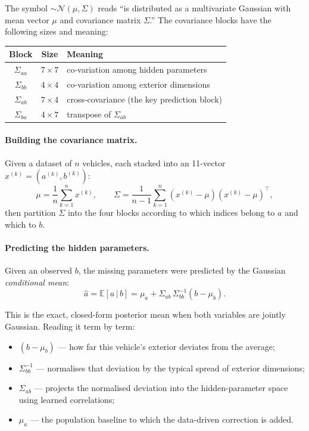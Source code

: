 \documentclass[11pt]{article}
\newcommand{\given}{\,\vert\,}
\theoremstyle{definition}
\begin{document}
The symbol $\sim \mathcal{N}(\mu,\Sigma)$ reads ``is distributed as a multivariate Gaussian with mean vector $\mu$ and covariance matrix $\Sigma$.'' The covariance blocks have the following sizes and meaning:
\begin{center}
\begin{tabular}{ccl}
\toprule
\textbf{Block} & \textbf{Size} & \textbf{Meaning} \\
\midrule
$\Sigma_{aa}$ & $7\times7$ & co-variation among hidden parameters \\
$\Sigma_{bb}$ & $4\times4$ & co-variation among exterior dimensions \\
$\Sigma_{ab}$ & $7\times4$ & cross-covariance (the key prediction block) \\
$\Sigma_{ba}$ & $4\times7$ & transpose of $\Sigma_{ab}$ \\
\bottomrule
\end{tabular}
\end{center}

\paragraph{Building the covariance matrix.} Given a dataset of $n$ vehicles, each stacked into an 11-vector $x^{(k)} = (a^{(k)}, b^{(k)})$:
\begin{equation}
\mu = \frac{1}{n}\sum_{k=1}^{n} x^{(k)}, \qquad
\Sigma = \frac{1}{n-1}\sum_{k=1}^{n} (x^{(k)} - \mu)(x^{(k)} - \mu)^{\top},
\end{equation}
then partition $\Sigma$ into the four blocks according to which indices belong to $a$ and which to $b$.

\paragraph{Predicting the hidden parameters.} Given an observed $b$, the missing parameters were predicted by the Gaussian \emph{conditional mean}:
\begin{equation}
\hat{a} = \mathbb{E}[a \given b] = \mu_a + \Sigma_{ab}\,\Sigma_{bb}^{-1}(b - \mu_b).
\label{eq:cond}
\end{equation}

This is the exact, closed-form posterior mean when both variables are jointly Gaussian. Reading it term by term:
\begin{itemize}[leftmargin=2em]
    \item $(b - \mu_b)$ --- how far this vehicle's exterior deviates from the average;
    \item $\Sigma_{bb}^{-1}$ --- normalises that deviation by the typical spread of exterior dimensions;
    \item $\Sigma_{ab}$ --- projects the normalised deviation into the hidden-parameter space using learned correlations;
    \item $\mu_a$ --- the population baseline to which the data-driven correction is added.
\end{itemize}
\end{document}
